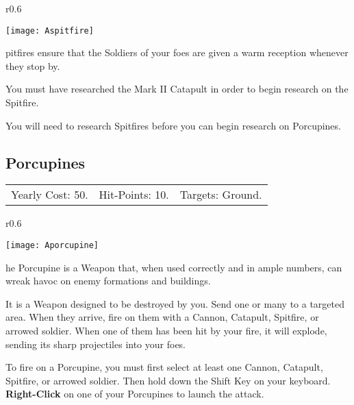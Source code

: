 \begin{wrapfigure}{r}{0.6\textwidth}
    \vspace{-20pt}
    \begin{center}
        \texttt{[image: Aspitfire]} %
    \end{center}
    \vspace{-20pt}
\end{wrapfigure}

pitfires ensure that the Soldiers of your foes are given a warm reception whenever they stop by.

You must have researched the Mark II Catapult in order to begin research on the Spitfire. 

You will need to research Spitfires before you can begin research on Porcupines.

\clearpage  %

\subsection{\textsf{Porcupines}}


\begin{tabular}{p{1.264in} p{1.264in} p{1.264in}}
Yearly Cost: 50. & Hit-Points: 10. & Targets: Ground.
\end{tabular}

\begin{wrapfigure}{r}{0.6\textwidth}
    \vspace{-20pt}
    \begin{center}
        \texttt{[image: Aporcupine]} %
    \end{center}
    \vspace{-20pt}
\end{wrapfigure}

he Porcupine is a Weapon that, when used correctly and in ample numbers, can wreak havoc on enemy formations and buildings.

It is a Weapon designed to be destroyed by you. Send one or many to a targeted area. When they arrive, fire on them with a Cannon, Catapult, Spitfire, or arrowed soldier. When one of them has been hit by your fire, it will explode, sending its sharp projectiles into your foes.


To fire on a Porcupine, you must first select at least one Cannon, Catapult, Spitfire, or arrowed soldier. Then hold down the Shift Key on your keyboard. \textbf{Right-Click} on one of your Porcupines to launch the attack.


